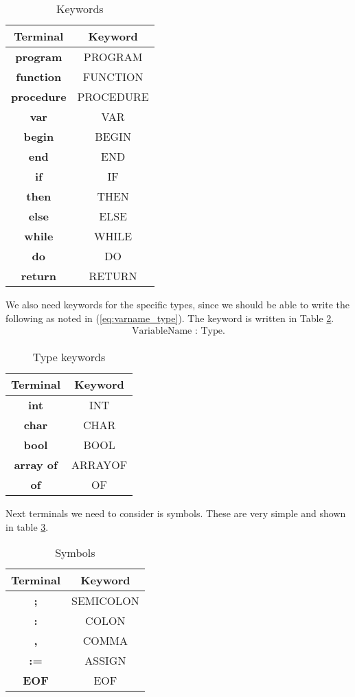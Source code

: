 \documentclass[10pt]{article}
\begin{document}
\begin{table}[h!]
\centering
\begin{tabular}{c|c}
Terminal & Keyword \\
\hline
\textbf{program} & PROGRAM \\
\textbf{function} & FUNCTION \\
\textbf{procedure} & PROCEDURE \\
\textbf{var} & VAR \\
\textbf{begin} & BEGIN \\
\textbf{end} & END \\
\textbf{if} & IF \\
\textbf{then} & THEN \\
\textbf{else} & ELSE \\
\textbf{while} & WHILE \\
\textbf{do} & DO \\
\textbf{return} & RETURN \\
\end{tabular}
\caption{\label{tab:keywords}Keywords}
\end{table}

We also need keywords for the specific types, since we should be able to write the following as noted in (\ref{eq:varname_type}). The keyword is written in Table \ref{tab:type_keywords}.
\begin{align}
\label{eq:varname_type}
\text{VariableName} \textbf{ : } \text{Type}.
\end{align}

\begin{table}[h!]
\centering
\begin{tabular}{c|c}
Terminal & Keyword \\
\hline
\textbf{int} & INT \\
\textbf{char} & CHAR \\
\textbf{bool} & BOOL \\
\textbf{array of} & ARRAYOF \\
\textbf{of} & OF \\
\end{tabular}
\caption{\label{tab:type_keywords}Type keywords}
\end{table}

Next terminals we need to consider is symbols. These are very simple and shown in table \ref{tab:symbols}.

\begin{table}[h!]
\centering
\begin{tabular}{c|c}
Terminal & Keyword \\
\hline
\textbf{;} & SEMICOLON \\
\textbf{:} & COLON \\
\textbf{,} & COMMA \\
\textbf{:=} & ASSIGN \\
\textbf{EOF} & EOF \\
\end{tabular}
\caption{\label{tab:symbols}Symbols}
\end{table}
\end{document}

